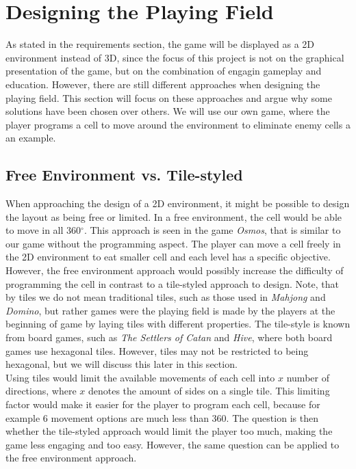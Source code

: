 \section{Designing the Playing Field}
\label{sec:designing_playing_field}
As stated in the requirements section, the game will be displayed as a 2D environment instead of 3D, since the focus of this project is not on the graphical presentation of the game, but on the combination of engagin gameplay and education. However, there are still different approaches when designing the playing field. This section will focus on these approaches and argue why some solutions have been chosen over others. We will use our own game, where the player programs a cell to move around the environment to eliminate enemy cells a an example.

\subsection{Free Environment vs. Tile-styled}

When approaching the design of a 2D environment, it might be possible to design the layout as being free or limited.
In a free environment, the cell would be able to move in all 360$^{\circ}$.
This approach is seen in the game \textit{Osmos}, that is similar to our game without the programming aspect.
The player can move a cell freely in the 2D environment to eat smaller cell and each level has a specific objective.
However, the free environment approach would possibly increase the difficulty of programming the cell in contrast to a tile-styled approach to design.
Note, that by tiles we do not mean traditional tiles, such as those used in \textit{Mahjong} and \textit{Domino}, but rather games were the playing field is made by the players at the beginning of game by laying tiles with different properties.
The tile-style is known from board games, such as \textit{The Settlers of Catan} and \textit{Hive}, where both board games use hexagonal tiles.
However, tiles may not be restricted to being hexagonal, but we will discuss this later in this section.\\

Using tiles would limit the available movements of each cell into $x$ number of directions, where $x$ denotes the amount of sides on a single tile. This limiting factor would make it easier for the player to program each cell, because for example $6$ movement options are much less than $360$. The question is then whether the tile-styled approach would limit the player too much, making the game less engaging and too easy. However, the same question can be applied to the free environment approach.\\

